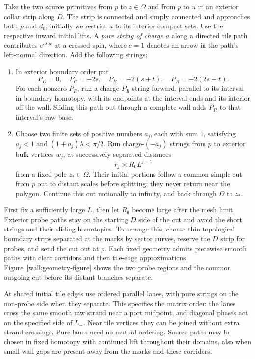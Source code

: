 Take the two source primitives from $p$ to $z\in\Omega$ and from $p$
to $u$ in an exterior collar strip along $D$.  The strip is connected
and simply connected and approaches both $p$ and $d_0$; initially
we restrict $u$ to its interior compact sets.  Use the respective
inward initial lifts.  A \emph{pure string of charge $a$} along a
directed tile path contributes $e^{i\lambda ac}$ at a crossed spin,
where $c=1$ denotes an arrow in the path's left-normal direction.
Add the following strings:
\begin{enumerate}[label=(\roman*),leftmargin=*]
\item In exterior boundary order put
\begin{equation}
 P_D=0,\quad P_C=-2s,\quad P_B=-2(s+t),\quad P_A=-2(2s+t).
 \label{wall:short-charges}
\end{equation}
For each nonzero $P_R$, run a charge-$P_R$ string forward, parallel
to its interval in boundary homotopy, with its endpoints at the interval
ends and its interior off the wall.  Sliding this path out through a
complete wall adds $P_R$ to that interval's raw base.
\item Choose two finite sets of positive numbers $a_j$, each with sum
$1$, satisfying $a_j<1$ and $(1+a_j)\lambda<\pi/2$.
Run charge-$(-a_j)$ strings from $p$ to exterior bulk vertices $w_j$,
at successively separated distances
\begin{equation}
 r_j\asymp R_0L^{j-1}
 \label{wall:distant-scales}
\end{equation}
from a fixed pole $z_*\in\Omega$.  Their initial portions follow a
common simple cut from $p$ out to distant scales before splitting;
they never return near the polygon.  Continue this cut notionally to
infinity, and back through $\Omega$ to $z_*$.
\end{enumerate}
First fix a sufficiently large $L$, then let $R_0$ become large after
the mesh limit.  Exterior probe paths stay on the starting $D$ side
of the cut and avoid the short strings and their sliding homotopies.
To arrange this, choose thin topological boundary strips separated
at the marks by sector curves, reserve the $D$ strip for probes, and
send the cut out at $p$.  Each fixed geometry admits piecewise smooth
paths with clear corridors and then tile-edge approximations.
Figure~\ref{wall:geometry-figure} shows the two probe regions and the
common outgoing cut before its distant branches separate.



At shared initial tile edges use ordered parallel lanes, with pure
strings on the non-probe side when they separate.  This specifies the
matrix order: the lanes cross the same smooth raw strand near a port
midpoint, and diagonal phases act on the specified side of $L_-$.
Near tile vertices they can be joined without extra strand crossings.
Pure lanes need no mutual ordering.  Source paths may be chosen in
fixed homotopy with continued lift throughout their domains, also when
small wall gaps are present away from the marks and these corridors.

